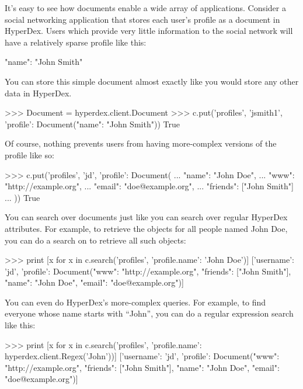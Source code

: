 It's easy to see how documents enable a wide array of applications.  Consider a
social networking application that stores each user's profile as a document in
HyperDex.  Users which provide very little information to the social network
will have a relatively sparse profile like this:

\begin{jsoncode}
{"name": "John Smith"}
\end{jsoncode}

You can store this simple document almost exactly like you would store any other
data in HyperDex.

\begin{pythoncode}
>>> Document = hyperdex.client.Document
>>> c.put('profiles', 'jsmith1', {'profile': Document({"name": "John Smith"})})
True
\end{pythoncode}

Of course, nothing prevents users from having more-complex versions of the
profile like so:

\begin{pythoncode}
>>> c.put('profiles', 'jd', {'profile': Document({
...     "name": "John Doe",
...     "www": "http://example.org",
...     "email": "doe@example.org",
...     "friends": ["John Smith"]
... })})
True
\end{pythoncode}

You can search over documents just like you can search over regular HyperDex
attributes.  For example, to retrieve the objects for all people named John Doe,
you can do a search on  to retrieve all such objects:

\begin{pythoncode}
>>> print [x for x in c.search('profiles', {'profile.name': 'John Doe'})]
[{'username': 'jd', 'profile': Document({"www": "http://example.org", "friends":
["John Smith"], "name": "John Doe", "email": "doe@example.org"})}]
\end{pythoncode}

You can even do HyperDex's more-complex queries.  For example, to find everyone
whose name starts with ``John'', you can do a regular expression search like
this:

\begin{pythoncode}
>>> print [x for x in c.search('profiles', {'profile.name': hyperdex.client.Regex('John')})]
[{'username': 'jd', 'profile': Document({"www": "http://example.org", "friends":
["John Smith"], "name": "John Doe", "email": "doe@example.org"})}]
\end{pythoncode}

